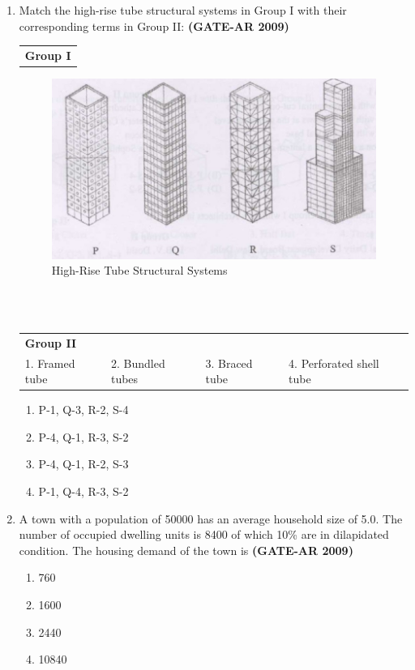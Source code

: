 \documentclass[a4paper,10pt]{article}
\begin{document}
\begin{enumerate}
    \item Match the high-rise tube structural systems in Group I with their corresponding terms in Group II: \hfill \textbf{(GATE-AR 2009)} \\
    \begin{tabular}{ l }
	\textbf{Group I} \\
	\end{tabular}
	\begin{figure}[h!]
        \centering
        \includegraphics[width=0.5\linewidth]{figs/img_02.jpg}
	\caption{High-Rise Tube Structural Systems}
	\label{fig:2}
    \end{figure} \\
     \\
    \begin{tabular}{ l l l l }
	\textbf{Group II} & & & \\
	1. Framed tube & 2. Bundled tubes & 3. Braced tube & 4. Perforated shell tube \\
	\end{tabular}
	\begin{multicols}{2}
	\begin{enumerate}
        \item P-1, Q-3, R-2, S-4
        \item P-4, Q-1, R-3, S-2
        \item P-4, Q-1, R-2, S-3
        \item P-1, Q-4, R-3, S-2
    \end{enumerate}
	\end{multicols}

    \item A town with a population of 50000 has an average household size of 5.0. The number of occupied dwelling units is 8400 of which 10\% are in dilapidated condition. The housing demand of the town is \hfill \textbf{(GATE-AR 2009)}
    \begin{multicols}{4}
	\begin{enumerate}
        \item 760
        \item 1600
        \item 2440
        \item 10840
    \end{enumerate}
	\end{multicols}


\end{enumerate}
\end{document}
